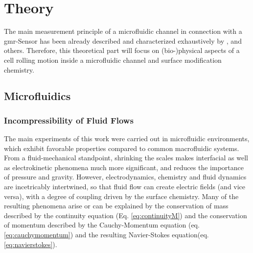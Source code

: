 \setcounter{page}{1}
\chapter{Theory}
The main measurement principle of a microfluidic channel in connection with a \gls{gmr}-Sensor has been already described and characterized exhaustively by \citet{lit:thes:helou}, \citet{lit:thes:reisbeck} and others. \cite{lit:thes:esthi,lit:thes:brenner} Therefore, this theoretical part will focus on (bio-)physical aspects of a cell rolling motion inside a microfluidic channel and surface modification chemistry.

\section{Microfluidics}

\subsection{Incompressibility of Fluid Flows}

The main experiments of this work were carried out in microfluidic environments, which exhibit favorable properties compared to common macrofluidic systems. From a fluid-mechanical standpoint, shrinking the scales makes interfacial as well as electrokinetic phenomena much more significant, and reduces the importance of pressure and gravity.\cite{lit:fluidic:kirby} However, electrodynamics, chemistry and fluid dynamics are incetricably intertwined, so that fluid flow can create electric fields (and vice versa), with a degree of coupling driven by the surface chemistry. Many of the resulting phenomena arise or can be explained by the conservation of mass described by the continuity equation (Eq. \ref{eq:continuityM}) and the conservation of momentum described by the Cauchy-Momentum equation (eq. \ref{eq:cauchymomentum}) and the resulting Navier-Stokes equation(eq. \ref{eq:navierstokes}).

